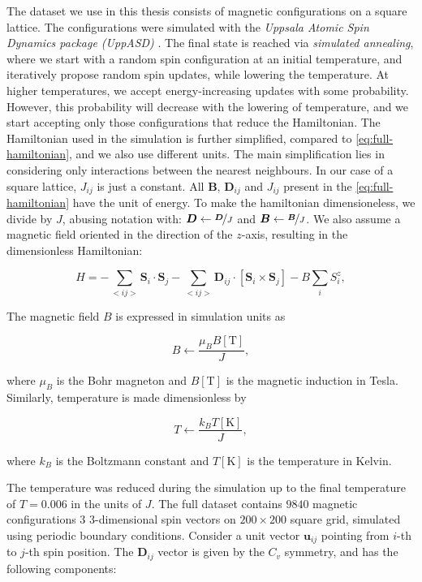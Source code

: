 The dataset we use in this thesis consists of magnetic configurations on a square lattice. The configurations were simulated with the \emph{Uppsala Atomic Spin Dynamics package (UppASD)} \cite{skubic2008method, eriksson2017atomistic}. The final state is reached via \emph{simulated annealing}, where we start with a random spin configuration at an initial temperature, and iteratively propose random spin updates, while lowering the temperature. At higher temperatures, we accept energy-increasing updates with some probability. However, this probability will decrease with the lowering of temperature, and we start accepting only those configurations that reduce the Hamiltonian. The Hamiltonian used in the simulation is further simplified, compared to \ref{eq:full-hamiltonian}, and we also use different units. The main simplification lies in considering only interactions between the nearest neighbours. In our case of a square lattice, $J_{ij}$ is just a constant. All $\bm{B}$, $\bm{D}_{ij}$ and $J_{ij}$ present in the \ref{eq:full-hamiltonian} have the unit of energy. To make the hamiltonian dimensioneless, we divide by $J$, abusing notation with: $\bm{D} \leftarrow \nicefrac{\bm{D}}{J}$ and $\bm{B} \leftarrow \nicefrac{\bm{B}}{J}$. We also assume a magnetic field oriented in the direction of the $z$-axis, resulting in the dimensionless Hamiltonian:

\begin{equation}
	\label{eq:MC-hamiltonian}
	H = - \sum_{<ij>} \bm{S}_i \cdot \bm{S}_j
	- \sum_{<ij>} \bm{D}_{ij} \cdot \left[\bm{S}_i \times \bm{S}_j\right] 
	- B \sum_i S_i^z,
\end{equation}

The magnetic field $B$ is expressed in simulation units as

\begin{equation}
	B \leftarrow \frac{\mu_B B[\text{T}]}{J},
\end{equation}

where $\mu_B$ is the Bohr magneton and $B[\text{T}]$ is the magnetic induction in Tesla. Similarly, temperature is made dimensionless by

\begin{equation}
	T \leftarrow \frac{k_B T[\text{K}]}{J},
\end{equation}

where $k_B$ is the Boltzmann constant and $T[\text{K}]$ is the temperature in Kelvin. 

The temperature was reduced during the simulation up to the final temperature of $T=0.006$ in the units of $J$. The full dataset contains $9840$ magnetic configurations $3$ $3$-dimensional spin vectors on $200\times200$ square grid, simulated using periodic boundary conditions. Consider a unit vector $\bm{u}_{ij}$ pointing from $i$-th to $j$-th spin position. The $\bm{D}_{ij}$ vector is given by the $C_v$ symmetry, and has the following components:

